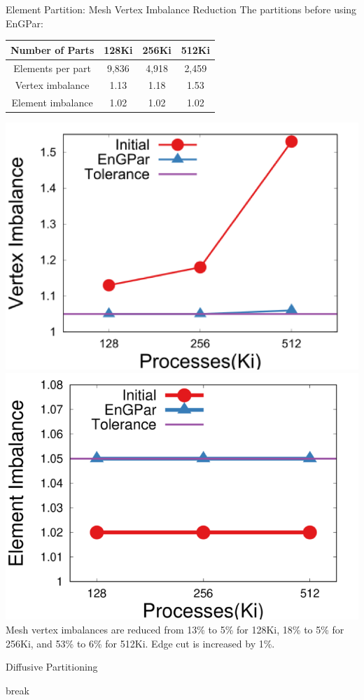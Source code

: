 \documentclass[final]{beamer}
\newlength{\onecolwid}
\begin{document}
\begin{frame}[t]
\begin{columns}[t]
\begin{column}{\onecolwid}
\begin{block}{Element Partition: Mesh Vertex Imbalance Reduction}
  The partitions before using EnGPar:\\
  \begin{table}[!h]
    \small
    \centering
    \begin{tabular}{||c|c|c|c||}
      \hline
      Number of Parts &128Ki&256Ki&512Ki \\
      \hline
      Elements per part & 9,836 & 4,918&2,459  \\
      \hline
      Vertex imbalance & 1.13 & 1.18 & 1.53 \\
      \hline
      Element imbalance & 1.02& 1.02& 1.02\\
      \hline
    \end{tabular}
  \end{table}
  {\centering
    \includegraphics[width=.6\textwidth]{../accelerated_cse19/figures/elmPtn_vtxImb.png}
    \includegraphics[width=.6\textwidth]{../accelerated_cse19/figures/elmPtn_elmImb.png} \\
    Mesh vertex imbalances are reduced from 13\% to 5\% for 128Ki, 18\% to 5\% for
    256Ki, and 53\% to 6\% for 512Ki.  Edge cut is increased by 1\%.
  }
\end{block}


\begin{block}{Diffusive Partitioning}
  \begin{algorithm}[H]
    \caption{Diffusive Load Balancing Framework}
    \label{alg:engpar}
    \small
    \begin{algorithmic}[1]
      \State break
      \EndIf
      \EndWhile
      \EndFor
      \EndProcedure


\end{algorithmic}
\end{algorithm}
\end{block}
\end{column}
\end{columns}
\end{frame}
\end{document}
